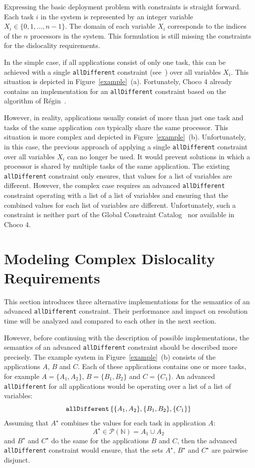 \documentclass[english,biblatex]{lni}
\begin{document}
Expressing the basic deployment problem with constraints is straight forward.
Each task $i$ in the system is represented by an integer variable $X_i \in \{0, 1, \dots, n-1\}$. The domain of each variable $X_i$ corresponds to the indices of the $n$ processors in the system.
This formulation is still missing the constraints for the dislocality requirements.

In the simple case, if all applications consist of only one task, this can be achieved with a single \texttt{allDifferent} constraint (see~\cite{GCCAT2014}) over all variables $X_i$.
This situation is depicted in Figure~\ref{example}~(a).
Fortunately, Choco 4 already contains an implementation for an \texttt{allDifferent} constraint based on the algorithm of Régin~\cite{Regin1994}.

However, in reality, applications usually consist of more than just one task and tasks of the same application \emph{can} typically share the same processor.
This situation is more complex and depicted in Figure~\ref{example}~(b).
Unfortunately, in this case, the previous approach of applying a single \texttt{allDifferent} constraint over all variables $X_i$ can no longer be used.
It would prevent solutions in which a processor is shared by multiple tasks of the same application.
The existing \texttt{allDifferent} constraint only ensures, that values for a list of variables are different.
However, the complex case requires an advanced \texttt{allDifferent} constraint operating with a list of a list of variables and ensuring that the combined values for each list of variables are different.
Unfortunately, such a constraint is neither part of the Global Constraint Catalog~\cite{GCCAT2014} nor available in Choco 4.

\section{Modeling Complex Dislocality Requirements}

This section introduces three alternative implementations for the semantics of an advanced \texttt{allDifferent} constraint.
Their performance and impact on resolution time will be analyzed and compared to each other in the next section.

However, before continuing with the description of possible implementations, the semantics of an advanced \texttt{allDifferent} constraint should be described more precisely.
The example system in Figure~\ref{example}~(b) consists of the applications $A$, $B$ and $C$.
Each of these applications contains one or more tasks, for example $A = \{A_1, A_2\}$, $B = \{B_1, B_2\}$ and $C = \{C_1\}$.
An advanced \texttt{allDifferent} for all applications would be operating over a list of a list of variables:
$$\textrm{\texttt{allDifferent}}\left\{\{A_1, A_2\}, \{B_1, B_2\}, \{C_1\}\right\}$$
Assuming that $A^\star$ combines the values for each task in application $A$:
$$A^\star \in \mathcal{P}(\mathbb{N}) = A_1\cup A_2$$
and $B^\star$ and $C^\star$ do the same for the applications $B$ and $C$, then the advanced \texttt{allDifferent} constraint would ensure, that the sets $A^\star$, $B^\star$ and $C^\star$ are pairwise disjunct.
\end{document}
